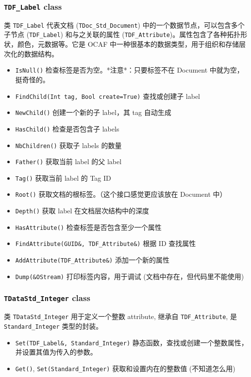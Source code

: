\documentclass[11pt]{article}
\begin{document}
\subsubsection{\texttt{TDF\_Label} class}
\label{sec:orgff6d0b6}

类 \texttt{TDF\_Label} 代表文档 (\texttt{TDoc\_Std\_Document}) 中的一个数据节点，可以包含多个子节点 (\texttt{TDF\_Label}) 和与之关联的属性 (\texttt{TDF\_Attribute})。属性包含了各种拓扑形状，颜色，元数据等。它是 OCAF 中一种很基本的数据类型，用于组织和存储层次化的数据结构。

\begin{itemize}
\item \texttt{IsNull()} 检查标签是否为空。*注意*：只要标签不在 Document 中就为空，挺奇怪的。
\item \texttt{FindChild(Int tag, Bool create=True)} 查找或创建子 label
\item \texttt{NewChild()} 创建一个新的子 label，其 tag 自动生成
\item \texttt{HasChild()} 检查是否包含子 labels
\item \texttt{NbChildren()} 获取子 labels 的数量
\item \texttt{Father()} 获取当前 label 的父 label
\item \texttt{Tag()} 获取当前 label 的 Tag ID
\item \texttt{Root()} 获取文档的根标签。（这个接口感觉更应该放在 Document 中）
\item \texttt{Depth()} 获取 label 在文档层次结构中的深度
\item \texttt{HasAttribute()} 检查标签是否包含至少一个属性
\item \texttt{FindAttribute(GUID\&, TDF\_Attribute\&)} 根据 ID 查找属性
\item \texttt{AddAttribute(TDF\_Attribute\&)} 添加一个新的属性
\item \texttt{Dump(\&OStream)} 打印标签内容，用于调试 (文档中存在，但代码里不能使用)
\end{itemize}
\subsubsection{\texttt{TDataStd\_Integer} class}
\label{sec:orgf2114e3}

类 \texttt{TDataStd\_Integer} 用于定义一个整数 attribute, 继承自 \texttt{TDF\_Attribute}, 是 \texttt{Standard\_Integer} 类型的封装。

\begin{itemize}
\item \texttt{Set(TDF\_Label\&, Standard\_Integer)} 静态函数，查找或创建一个整数属性，并设置其值为传入的参数。
\item \texttt{Get()}, \texttt{Set(Standard\_Integer)} 获取和设置内在的整数值 (不知道怎么用)
\end{itemize}
\end{document}
